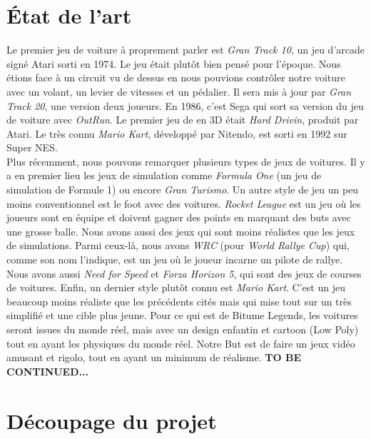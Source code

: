 \documentclass[11pt,a4paper]{article}
\begin{document}
\section{État de l'art}
  Le premier jeu de voiture à proprement parler est \textit{Gran Track 10}, un jeu d'arcade signé Atari 
  sorti en 1974. Le jeu était plutôt bien pensé pour l'époque. Nous étions face à un 
  circuit vu de dessus en nous pouvions contrôler notre voiture avec un volant, un levier de vitesses
  et un pédalier. Il sera mis à jour par \textit{Gran Track 20}, une version deux joueurs.
  En 1986, c'est Sega qui sort sa version du jeu de voiture avec \textit{OutRun}. Le premier 
  jeu de en 3D était \textit{Hard Drivin}, produit par Atari. Le très connu \textit{Mario Kart},
  développé par Nitendo, est sorti en 1992 sur Super NES.\\
  \indent Plus récemment, nous pouvons remarquer plusieurs types de jeux de voitures. Il y a en premier lieu 
  les jeux de simulation comme \textit{Formula One} (un jeu de simulation de Formule 1) ou encore 
  \textit{Gran Turismo}. Un autre style de jeu un peu moins conventionnel est le foot avec des voitures. 
  \textit{Rocket League} est un jeu où les joueurs sont en équipe  et doivent gagner des
  points en marquant des buts avec une grosse balle. Nous avons aussi des jeux qui sont moins réalistes
  que les jeux de simulations. Parmi ceux-là, nous avons \textit{WRC} (pour \textit{World Rallye Cup})
  qui, comme son nom l'indique, est un jeu où le joueur incarne un pilote de rallye. Nous avons aussi 
  \textit{Need for Speed} et \textit{Forza Horizon 5}, qui sont des jeux de courses de voitures.
  Enfin, un dernier style plutôt connu est \textit{Mario Kart}. C'est un jeu beaucoup moins réaliste
  que les précédents cités mais qui mise tout sur un très simplifié et une cible plus jeune. 
  Pour ce qui est de Bitume Legends, les voitures seront issues du monde réel, mais avec un design
  enfantin et cartoon (Low Poly) tout en ayant les physiques du monde réel. Notre But est de faire 
  un jeux vidéo amusant et rigolo, tout en ayant un minimum de réalisme.
  \textbf{TO BE CONTINUED...}
\clearpage

\section{Découpage du projet}
\end{document}
